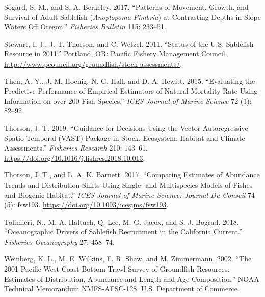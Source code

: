 \documentclass[11pt,
  english,
  a4paper,
]{article}
\newlength{\cslhangindent}
\newenvironment{cslreferences}%
  {\setlength{\parindent}{0pt}%
  \everypar{\setlength{\hangindent}{\cslhangindent}}\ignorespaces}%
  {\par}
\begin{document}
\begin{cslreferences}
\leavevmode\hypertarget{ref-sogard2017}{}%
Sogard, S. M., and S. A. Berkeley. 2017. ``Patterns of Movement, Growth, and Survival of Adult Sablefish (\emph{Anoplopoma Fimbria}) at Contrasting Depths in Slope Waters Off Oregon.'' \emph{Fisheries Bulletin} 115: 233--51.

\leavevmode\hypertarget{ref-stewart2011sablefish}{}%
Stewart, I. J., J. T. Thorson, and C. Wetzel. 2011. ``Status of the U.S. Sablefish Resource in 2011.'' Portland, OR: Pacific Fishery Management Council. \url{http://www.pcouncil.org/groundfish/stock-assessments/}.

\leavevmode\hypertarget{ref-then2015}{}%
Then, A. Y., J. M. Hoenig, N. G. Hall, and D. A. Hewitt. 2015. ``Evaluating the Predictive Performance of Empirical Estimators of Natural Mortality Rate Using Information on over 200 Fish Species.'' \emph{ICES Journal of Marine Science} 72 (1): 82--92.

\leavevmode\hypertarget{ref-thorson_guidance_2019}{}%
Thorson, J. T. 2019. ``Guidance for Decisions Using the Vector Autoregressive Spatio-Temporal (VAST) Package in Stock, Ecosystem, Habitat and Climate Assessments.'' \emph{Fisheries Research} 210: 143--61. \url{https://doi.org/10.1016/j.fishres.2018.10.013}.

\leavevmode\hypertarget{ref-thorson_comparing_2017}{}%
Thorson, J. T., and L. A. K. Barnett. 2017. ``Comparing Estimates of Abundance Trends and Distribution Shifts Using Single- and Multispecies Models of Fishes and Biogenic Habitat.'' \emph{ICES Journal of Marine Science: Journal Du Conseil} 74 (5): fsw193. \url{https://doi.org/10.1093/icesjms/fsw193}.

\leavevmode\hypertarget{ref-tolimieri2018}{}%
Tolimieri, N., M. A. Haltuch, Q. Lee, M. G. Jacox, and S. J. Bograd. 2018. ``Oceanographic Drivers of Sablefish Recruitment in the California Current.'' \emph{Fisheries Oceanography} 27: 458--74.

\leavevmode\hypertarget{ref-weinberg_2001_2002}{}%
Weinberg, K. L., M. E. Wilkins, F. R. Shaw, and M. Zimmermann. 2002. ``The 2001 Pacific West Coast Bottom Trawl Survey of Groundfish Resources: Estimates of Distribution, Abundance and Length and Age Composition.'' NOAA Technical Memorandum NMFS-AFSC-128. U.S. Department of Commerce.
\end{cslreferences}

\leavevmode\tagmcend\tagstructend

\clearpage

\end{document}

